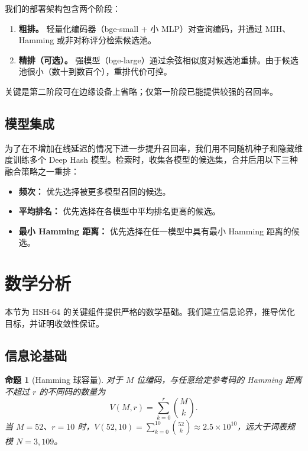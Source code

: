 \documentclass[11pt,a4paper]{article}
\newtheorem{proposition}{命题}
\begin{document}
我们的部署架构包含两个阶段：
\begin{enumerate}[leftmargin=*]
    \item \textbf{粗排。} 轻量化编码器（bge-small + 小 MLP）对查询编码，并通过 MIH、Hamming 或非对称评分检索候选池。
    \item \textbf{精排（可选）。} 强模型（bge-large）通过余弦相似度对候选池重排。由于候选池很小（数十到数百个），重排代价可控。
\end{enumerate}
关键是第二阶段可在边缘设备上省略；仅第一阶段已能提供较强的召回率。

\subsection{模型集成}

为了在不增加在线延迟的情况下进一步提升召回率，我们用不同随机种子和隐藏维度训练多个 Deep Hash 模型。检索时，收集各模型的候选集，合并后用以下三种融合策略之一重排：
\begin{itemize}[leftmargin=*]
    \item \textbf{频次：} 优先选择被更多模型召回的候选。
    \item \textbf{平均排名：} 优先选择在各模型中平均排名更高的候选。
    \item \textbf{最小 Hamming 距离：} 优先选择在任一模型中具有最小 Hamming 距离的候选。
\end{itemize}

\section{数学分析}
\label{sec:math-analysis-cn}

本节为 HSH-64 的关键组件提供严格的数学基础。我们建立信息论界，推导优化目标，并证明收敛性保证。

\subsection{信息论基础}

\begin{proposition}[Hamming 球容量]\label{prop:hamming-ball-cn}
对于 $M$ 位编码，与任意给定参考码的 Hamming 距离不超过 $r$ 的不同码的数量为
\begin{equation}
    V(M, r) = \sum_{k=0}^{r} \binom{M}{k}.
\end{equation}
当 $M=52$、$r=10$ 时，$V(52,10) = \sum_{k=0}^{10} \binom{52}{k} \approx 2.5 \times 10^{10}$，远大于词表规模 $N=3{,}109$。
\end{proposition}
\end{document}
